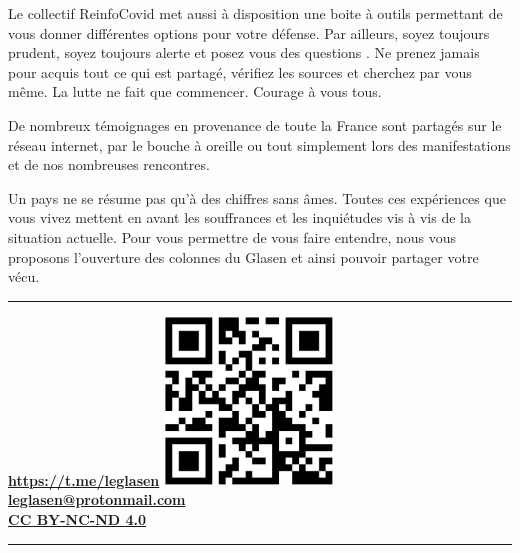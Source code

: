 \documentclass[a4paper]{article}
\begin{document}
\begin{multicols}{3}
  Le collectif ReinfoCovid met aussi à disposition une boite à outils
  \cite{ReinfoCovid:BoiteOutil} permettant de vous donner différentes
  options pour votre défense. Par ailleurs, soyez toujours prudent,
  soyez toujours alerte et posez vous des questions
  \cite{FloraHebridge:Conseil}. Ne prenez jamais pour acquis tout ce
  qui est partagé, vérifiez les sources et cherchez par vous même. La
  lutte ne fait que commencer. Courage à vous tous.
  
  \closearticle


  De nombreux témoignages en provenance de toute la France sont
  partagés sur le réseau internet, par le bouche à oreille ou tout
  simplement lors des manifestations et de nos nombreuses
  rencontres.

  Un pays ne se résume pas qu'à des chiffres sans âmes. Toutes ces
  expériences que vous vivez mettent en avant les souffrances et les
  inquiétudes vis à vis de la situation actuelle. Pour vous permettre
  de vous faire entendre, nous vous proposons l'ouverture des colonnes
  du Glasen et ainsi pouvoir partager votre vécu.
  
  \closearticle
  
\begin{center}
  \rule[1pt]{4.5cm}{1pt}
  \textbf{\url{https://t.me/leglasen}}
  \includegraphics[width=4.5cm,height=4.5cm]{qrcode-telegram.eps}
  \textbf{\href{mailto:leglasen@protonmail.com}{leglasen@protonmail.com}} \\
  \vspace*{0.2cm}
  \footnotesize\textbf{\href{https://creativecommons.org/licenses/by-nc-nd/4.0/legalcode.fr}{CC BY-NC-ND 4.0}}
  \vspace*{1cm}
  \rule[1pt]{4.5cm}{1pt}
\end{center}

\printbibliography[heading=none]

\end{multicols}
\end{document}
